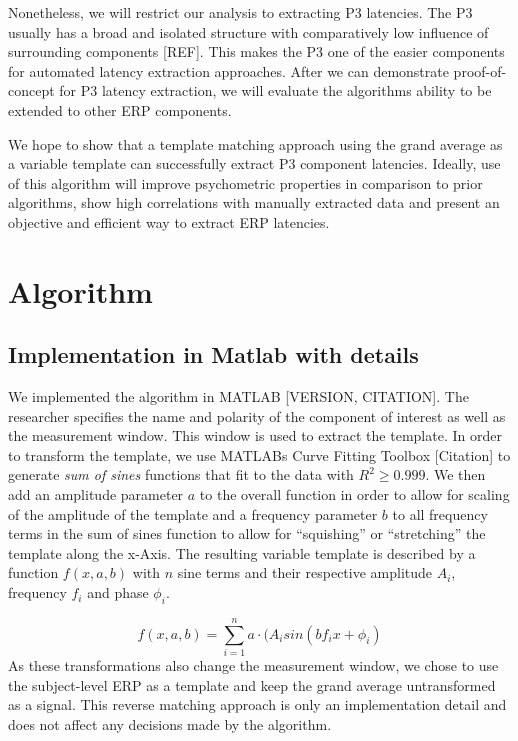 \documentclass[
  man,floatsintext]{apa7}
\begin{document}
Nonetheless, we will restrict our analysis to extracting P3 latencies. The P3 usually has a broad and isolated structure with comparatively low influence of surrounding components {[}REF{]}. This makes the P3 one of the easier components for automated latency extraction approaches. After we can demonstrate proof-of-concept for P3 latency extraction, we will evaluate the algorithms ability to be extended to other ERP components.

We hope to show that a template matching approach using the grand average as a variable template can successfully extract P3 component latencies. Ideally, use of this algorithm will improve psychometric properties in comparison to prior algorithms, show high correlations with manually extracted data and present an objective and efficient way to extract ERP latencies.

\hypertarget{algorithm}{%
\section{Algorithm}\label{algorithm}}

\hypertarget{implementation-in-matlab-with-details}{%
\subsection{Implementation in Matlab with details}\label{implementation-in-matlab-with-details}}

We implemented the algorithm in MATLAB {[}VERSION, CITATION{]}. The researcher specifies the name and polarity of the component of interest as well as the measurement window. This window is used to extract the template. In order to transform the template, we use MATLABs Curve Fitting Toolbox {[}Citation{]} to generate \emph{sum of sines} functions that fit to the data with \(R^2 \ge 0.999\). We then add an amplitude parameter \(a\) to the overall function in order to allow for scaling of the amplitude of the template and a frequency parameter \(b\) to all frequency terms in the sum of sines function to allow for ``squishing'' or ``stretching'' the template along the x-Axis. The resulting variable template is described by a function \(f(x, a, b)\) with \(n\) sine terms and their respective amplitude \(A_i\), frequency \(f_i\) and phase \(\phi_i\).

\[f(x, a, b) = \sum_{i = 1}^{n} a\cdot(A_isin(bf_ix + \phi_i)\]
As these transformations also change the measurement window, we chose to use the subject-level ERP as a template and keep the grand average untransformed as a signal. This reverse matching approach is only an implementation detail and does not affect any decisions made by the algorithm.
\end{document}
